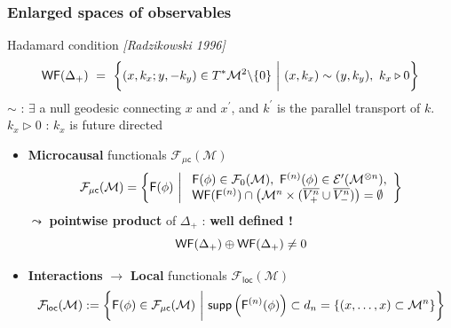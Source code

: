 \documentclass[9pt]{beamer}
\newcommand{\loc}{\mathsf{loc}}
\newcommand{\WF}{\mathsf{WF}}
\newcommand{\supp}{\mathsf{supp}}
\newcommand{\citebeam}[1]{\textit{\textcolor{black!60!white}{[#1]}}}
\newcommand{\Ecal}{\mathcal{E}}
\newcommand{\Fcal}{\mathcal{F}}
\newcommand{\Mcal}{\mathcal{M}}
\newcommand{\Fsf}{\mathsf{F}}
\newcommand{\csf}{\mathsf{c}}
\begin{document}

\begin{frame}

\frametitle{Enlarged spaces of observables}
  
\vfill  

\begin{exampleblock}{Hadamard condition \citebeam{Radzikowski 1996}}
\vspace*{-25pt}
\begin{equation*}
\WF(\Delta_+) \ = \ \bigg\{ (x,k_x ; y,-k_y) \in T^\ast\Mcal^2 \backslash \{0\} \ \bigg| \ (x,k_x) \sim (y,k_y) , \ k_x \triangleright 0 \bigg\}
\vspace*{-10pt}
\end{equation*}
$\sim$ : $\exists$ a null geodesic connecting $x$ and $x^\prime$, and $k^\prime$ is the parallel transport of $k$. \\
$k_x \triangleright 0$ : $k_x$ is future directed
\end{exampleblock}

\begin{itemize}

\item \textbf{Microcausal} functionals $\Fcal_{\mu\csf}(\Mcal)$
%
\vspace*{-5pt}
\begin{equation*}
\Fcal_{\mu\csf}(\Mcal) = \left\{ \Fsf(\phi) \ \bigg| \ 
\begin{array}{l}
\Fsf(\phi) \in \Fcal_0(\Mcal),  \ \Fsf^{(n)}(\phi) \in \Ecal^\prime(\Mcal^{\otimes n}), \\
\WF(\Fsf^{(n)}) \cap \left( \Mcal^n \times ( \overline{V^{n}_{+}} \cup \overline{V^{n}_{-}} ) \right)  = \emptyset 
\end{array}
\right\}
\vspace*{-7pt}
\end{equation*}
%
$\leadsto$ \textbf{pointwise product} of $\Delta_+$ : \textbf{well defined !} 
%
\vspace*{-5pt}
\begin{equation*}
\WF(\Delta_+) \oplus \WF(\Delta_+) \neq 0
\vspace*{-7pt}
\end{equation*}

\item \textbf{Interactions} $\to$ \textbf{Local} functionals $\Fcal_\loc(\Mcal)$ 
%
\vspace*{-7pt}
\begin{equation*}
\Fcal_\loc(\Mcal) := \left\{ \Fsf(\phi) \in \Fcal_{\mu\csf}(\Mcal) \ \bigg| \ \supp\left(\Fsf^{(n)}(\phi)\right) \subset d_n = \left\{ (x,\dots,x) \subset \Mcal^n \right\} \right\}
\vspace*{-7pt}
\end{equation*}
%
\end{itemize}

\vfill

\end{frame}  
\end{document}
